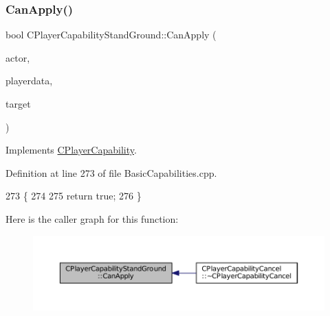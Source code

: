 \subsubsection{\texorpdfstring{Can\+Apply()}{CanApply()}}
{\footnotesize\ttfamily bool C\+Player\+Capability\+Stand\+Ground\+::\+Can\+Apply (\begin{DoxyParamCaption}\item[{std\+::shared\+\_\+ptr$<$ \hyperlink{classCPlayerAsset}{C\+Player\+Asset} $>$}]{actor,  }\item[{std\+::shared\+\_\+ptr$<$ \hyperlink{classCPlayerData}{C\+Player\+Data} $>$}]{playerdata,  }\item[{std\+::shared\+\_\+ptr$<$ \hyperlink{classCPlayerAsset}{C\+Player\+Asset} $>$}]{target }\end{DoxyParamCaption})\hspace{0.3cm}{\ttfamily [virtual]}}



Implements \hyperlink{classCPlayerCapability_ae96263e0950f496492f8baeb877b9554}{C\+Player\+Capability}.



Definition at line 273 of file Basic\+Capabilities.\+cpp.


\begin{DoxyCode}
273                                                                                                            
                                                        \{
274     
275     \textcolor{keywordflow}{return} \textcolor{keyword}{true};
276 \}
\end{DoxyCode}
Here is the caller graph for this function\+:
\nopagebreak
\begin{figure}[H]
\begin{center}
\leavevmode
\includegraphics[width=350pt]{classCPlayerCapabilityStandGround_a468f2618edaebf2088b5917d2688b6f6_icgraph}
\end{center}
\end{figure}
\hypertarget{classCPlayerCapabilityStandGround_a5567bfa47166f4080bd2b86f5c33e29c}{}\label{classCPlayerCapabilityStandGround_a5567bfa47166f4080bd2b86f5c33e29c} 
